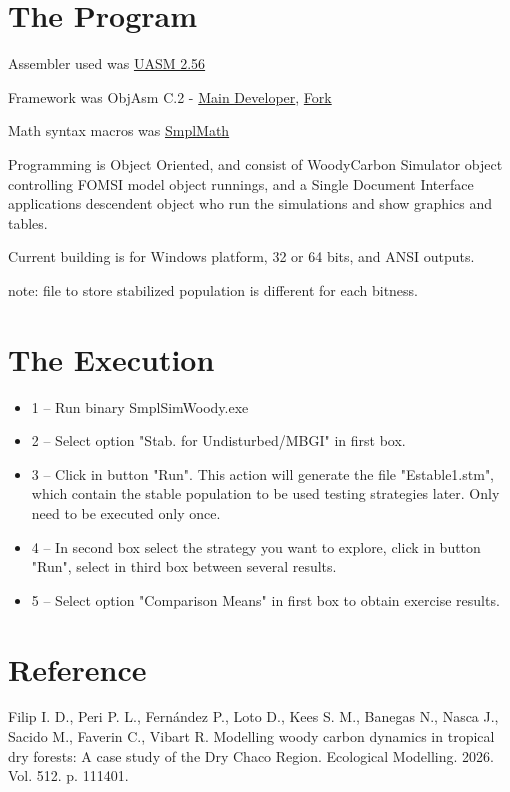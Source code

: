 \documentclass[11pt,a4paper,numbers=enddot]{scrartcl}
\begin{document}
\section {The Program}
	
	Assembler used was \href{http://www.terraspace.co.uk/uasm.html}{UASM 2.56}

	Framework was ObjAsm C.2  - 
     	\href{https://github.com/ObjAsm/ObjAsm-C.2}{Main Developer}, 
	 \href{https://github.com/ASMHSE/ObjAsm-C.2/tree/master}{Fork}

	Math syntax macros was \href{https://github.com/ASMHSE/SmplMath}{SmplMath}

	Programming is Object Oriented, and consist of WoodyCarbon Simulator object controlling FOMSI model object runnings, and a Single Document Interface applications descendent object who run the simulations and show graphics and tables. 

Current building is for Windows platform, 32 or 64 bits, and ANSI outputs. 

note: file to store stabilized population is different for each bitness.

\section {The Execution}
 \begin{itemize}
          \item 1 -- Run binary SmplSimWoody.exe
	\item 2 -- Select option "Stab. for Undisturbed/MBGI" in first box.
	\item 3 -- Click in button "Run". This action will generate the file "Estable1.stm", which contain the stable population to be used testing strategies later. Only need to be executed only once.
          \item 4 --  In second box select the strategy you want to explore, click in button "Run", select in third box between several results.
          \item 5 -- Select option "Comparison Means" in first box to obtain exercise results.

 \end{itemize}


\section{Reference}

Filip I. D., Peri P. L., Fernández P., Loto D., Kees S. M., Banegas N., Nasca J., Sacido M., Faverin C., Vibart R. Modelling woody carbon dynamics in tropical dry forests: A case study of the Dry Chaco Region. Ecological Modelling. 2026. Vol. 512. p. 111401.
\end{document}
